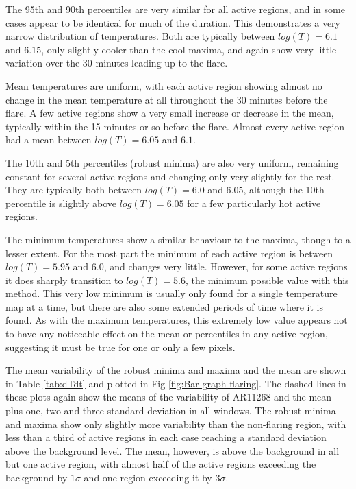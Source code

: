 \documentclass[namedreferences]{solarphysics}
\begin{document}
\begin{article}
The 95th and 90th percentiles are very similar for all active regions, and in some cases appear to be identical for much of the duration.
This demonstrates a very narrow distribution of temperatures.
Both are typically between $log(T)=6.1$ and $6.15$, only slightly cooler than the cool maxima, and again show very little variation over the 30 minutes leading up to the flare.

Mean temperatures are uniform, with each active region showing almost no change in the mean temperature at all throughout the 30 minutes before the flare.
A few active regions show a very small increase or decrease in the mean, typically within the 15 minutes or so before the flare.
Almost every active region had a mean between $log(T)=6.05$ and $6.1$.

The 10th and 5th percentiles (robust minima) are also very uniform, remaining constant for several active regions and changing only very slightly for the rest.
They are typically both between $log(T)=6.0$ and $6.05$, although the 10th percentile is slightly above $log(T)=6.05$ for a few particularly hot active regions.

The minimum temperatures show a similar behaviour to the maxima, though to a lesser extent.
For the most part the minimum of each active region is between $log(T)=5.95$ and $6.0$, and changes very little.
However, for some active regions it does sharply transition to $log(T)=5.6$, the minimum possible value with this method.
This very low minimum is usually only found for a single temperature map at a time, but there are also some extended periods of time where it is found.
As with the maximum temperatures, this extremely low value appears not to have any noticeable effect on the mean or percentiles in any active region, suggesting it must be true for one or only a few pixels.

The mean variability of the robust minima and maxima and the mean are shown in Table \ref{tab:dTdt} and plotted in Fig \ref{fig:Bar-graph-flaring}.
The dashed lines in these plots again show the means of the variability of AR11268 and the mean plus one, two and three standard deviation in all windows.
The robust minima and maxima show only slightly more variability than the non-flaring region, with less than a third of active regions in each case reaching a standard deviation above the background level.
The mean, however, is above the background in all but one active region, with almost half of the active regions exceeding the background by $1\sigma$ and one region exceeding it by $3\sigma$.


\end{article}
\end{document}

